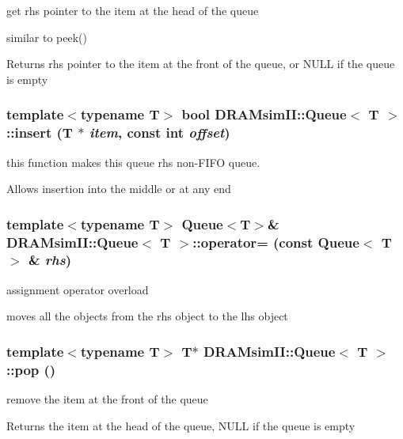 get rhs pointer to the item at the head of the queue 

similar to peek() \begin{DoxyReturn}{Returns}
rhs pointer to the item at the front of the queue, or NULL if the queue is empty 
\end{DoxyReturn}
\subsubsection[{insert}]{\setlength{\rightskip}{0pt plus 5cm}template$<$typename T$>$ bool {\bf DRAMsimII::Queue}$<$ T $>$::insert (T $\ast$ {\em item}, \/  const int {\em offset})\hspace{0.3cm}{\ttfamily  [inline]}}\label{class_d_r_a_msim_i_i_1_1_queue_a6b51d06f571c13b2e81a0c51623ba54d}


this function makes this queue rhs non-\/FIFO queue. 

Allows insertion into the middle or at any end 
\subsubsection[{operator=}]{\setlength{\rightskip}{0pt plus 5cm}template$<$typename T$>$ {\bf Queue}$<$T$>$\& {\bf DRAMsimII::Queue}$<$ T $>$::operator= (const {\bf Queue}$<$ T $>$ \& {\em rhs})\hspace{0.3cm}{\ttfamily  [inline]}}\label{class_d_r_a_msim_i_i_1_1_queue_ad108e491b4d2b5eed585f22cba0d66e5}


assignment operator overload 

moves all the objects from the rhs object to the lhs object 
\subsubsection[{pop}]{\setlength{\rightskip}{0pt plus 5cm}template$<$typename T$>$ T$\ast$ {\bf DRAMsimII::Queue}$<$ T $>$::pop ()\hspace{0.3cm}{\ttfamily  [inline]}}\label{class_d_r_a_msim_i_i_1_1_queue_af25337ce05c231a10809f6b3f3344e4d}


remove the item at the front of the queue 

\begin{DoxyReturn}{Returns}
the item at the head of the queue, NULL if the queue is empty 
\end{DoxyReturn}
